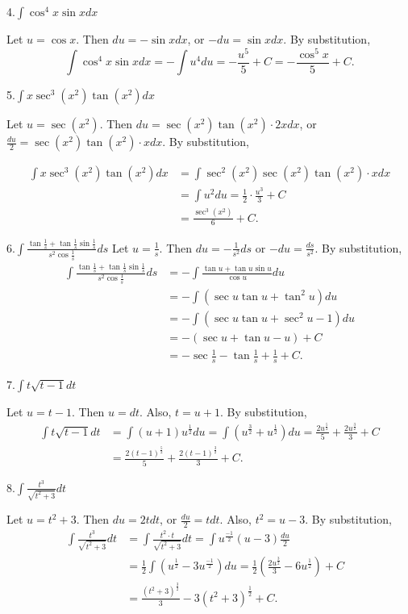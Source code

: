 \documentclass[
  letterpaper,
  DIV=11,
  numbers=noendperiod]{scrartcl}
\theoremstyle{plain}
\theoremstyle{remark}
\begin{document}
4.\(\int \cos^4 x \sin xdx\)

Let \(u=\cos x\). Then \(du=-\sin x dx\), or \(-du=\sin xdx\). By
substitution, \[
\int \cos^4 x \sin xdx=-\int u^4 du=-\frac{u^5}{5}+C=-\frac{\cos^5 x}{5}+C.
\]

5.\(\int x \sec^3 \left( x^2 \right)\tan\left(x^2\right)dx\)

Let \(u=\sec\left (x^2\right)\). Then
\(du=\sec\left(x^2\right)\tan\left(x^2\right)\cdot 2xdx\), or
\(\frac{du}{2}=\sec\left (x^2\right)\tan\left(x^2\right)\cdot xdx\). By
substitution,

\[
\begin{aligned}
\int x\sec^3 \left(x^2\right)\tan\left(x^2\right)dx &= \int \sec^2 \left(x^2\right)\sec\left(x^2\right)\tan\left(x^2\right)\cdot xdx \\ &= \int u^2du=\frac{1}{2}\cdot \frac{u^3}{3}+C \\& = \frac{\sec^3 \left(x^2\right)}{6} + C.
\end{aligned}
\]

6.\(\int \frac{\tan\frac{1}{s}+\tan\frac{1}{s}\sin\frac{1}{s}}{s^2\cos\frac{1}{s}}ds\)
Let \(u=\frac{1}{s}\). Then \(du=-\frac{1}{s^2}ds\) or
\(-du=\frac{ds}{s^2}\). By substitution, \[
\begin{aligned}
\int \frac{\tan\frac{1}{s}+\tan\frac{1}{s}\sin\frac{1}{s}}{s^2\cos\frac{1}{s}}ds &= -\int \frac{\tan u+\tan u \sin u}{\cos u}du\\&=-\int (\sec u \tan u + \tan^2 u)du\\&=-\int (\sec u \tan u +\sec^2 u -1 )du\\&=-(\sec u +\tan u-u) + C\\&=-\sec\frac{1}{s}-\tan\frac{1}{s}+\frac{1}{s}+C.  
\end{aligned}
\]

7.\(\int t\sqrt {t-1} dt\)

Let \(u=t-1\). Then \(u=dt\). Also, \(t=u+1\). By substitution,
\[ \begin{aligned}
\int t\sqrt{t-1} dt &=\int \left(u+1\right)u^\frac{1}{2}du =\int \left( u^\frac{3}{2}+u^\frac{1}{2} \right)du =\frac{2u^\frac{5}{2}}{5}+\frac{2u^\frac{3}{2}}{3}+C\\&=\frac{2\left(t-1\right)^\frac{5}{2}}{5}+\frac{2\left(t-1\right)^\frac{3}{2}}{3}+C.
\end{aligned}
\]

8.\(\int \frac{t^3}{\sqrt{t^2+3}}dt\)

Let \(u=t^2+3\). Then \(du=2tdt\), or \(\frac{du}{2}=tdt\). Also,
\(t^2=u-3\). By substitution, \[
\begin{aligned}
\int \frac{t^3}{\sqrt{t^2+3}}dt &= \int \frac{t^2\cdot{t}}{\sqrt {t^2+3}}dt=\int u^\frac{-1}{2}(u-3)\frac{du}{2}&\\&=\frac{1}{2}\int \left(u^\frac{1}{2}-3u^\frac{-1}{2}\right)du =\frac{1}{2} \left(\frac{2u^\frac{3}{2}}{3}-6u^\frac{1}{2}\right)+C \\& =\frac{\left(t^2+3\right)^\frac{3}{2}}{3}-3\left(t^2+3\right)^\frac{1}{2}+C.
\end{aligned}
\]
\end{document}

